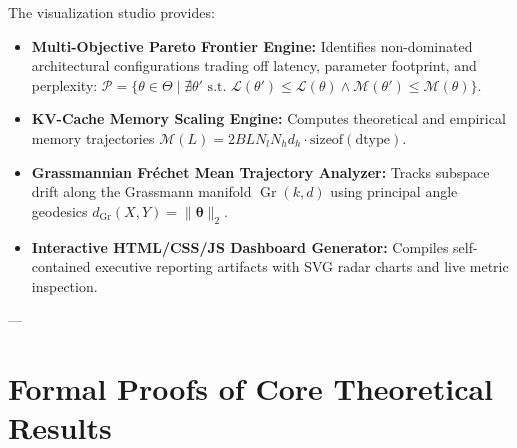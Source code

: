 \documentclass[10pt,twocolumn,letterpaper]{article}
\begin{document}
The visualization studio provides:
\begin{itemize}
    \item \textbf{Multi-Objective Pareto Frontier Engine:} Identifies non-dominated architectural configurations trading off latency, parameter footprint, and perplexity: $\mathcal{P} = \{ \theta \in \Theta \mid \nexists \theta' \text{ s.t. } \mathcal{L}(\theta') \le \mathcal{L}(\theta) \land \mathcal{M}(\theta') \le \mathcal{M}(\theta) \}$.
    \item \textbf{KV-Cache Memory Scaling Engine:} Computes theoretical and empirical memory trajectories $\mathcal{M}(L) = 2 B L N_l N_h d_h \cdot \text{sizeof}(\text{dtype})$.
    \item \textbf{Grassmannian Fr\'echet Mean Trajectory Analyzer:} Tracks subspace drift along the Grassmann manifold $\operatorname{Gr}(k, d)$ using principal angle geodesics $d_{\operatorname{Gr}}(X, Y) = \|\bm{\theta}\|_2$.
    \item \textbf{Interactive HTML/CSS/JS Dashboard Generator:} Compiles self-contained executive reporting artifacts with SVG radar charts and live metric inspection.
\end{itemize}

---

\section{Formal Proofs of Core Theoretical Results}
\label{app:proofs}
\end{document}
